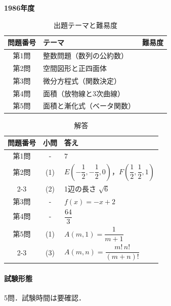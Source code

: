 \documentclass[../../main.tex]{subfiles}
\begin{document}
\begin{center}
  {\fontsize{48pt}{58pt}\selectfont \textbf{1986}\normalsize\textbf{年度}}
\end{center}

\begin{table}[htb]
  \centering
  \caption{出題テーマと難易度}
  \begin{tabular}{|c|p{9cm}|c|}
    \hline
    \textbf{問題番号} & \textbf{テーマ} & \textbf{難易度} \\
    \hline
    第1問 & 整数問題（数列の公約数） & \\
    \hline
    第2問 & 空間図形と正四面体 & \\
    \hline
    第3問 & 微分方程式（関数決定） & \\
    \hline
    第4問 & 面積（放物線と3次曲線） & \\
    \hline
    第5問 & 面積と漸化式（ベータ関数） & \\
    \hline
  \end{tabular}
\end{table}

\begin{table}[htb]
  \centering
  \caption{解答}
  \renewcommand{\arraystretch}{1.4}
  \begin{tabular}{|c|c|p{9cm}|}
    \hline
    \textbf{問題番号} & \textbf{小問} & \textbf{答え} \\
    \hline
    第1問 & - & $7$ \\
    \hline
    第2問 & (1) & $E\left(-\dfrac{1}{2},-\dfrac{1}{2},0\right)$，$F\left(\dfrac{1}{2},\dfrac{1}{2},1\right)$ \\
    \cline{2-3}
    & (2) & 1辺の長さ $\sqrt{6}$ \\
    \hline
    第3問 & - & $f(x)=-x+2$ \\
    \hline
    第4問 & - & $\dfrac{64}{3}$ \\
    \hline
    第5問 & (1) & $A(m,1)=\dfrac{1}{m+1}$ \\
    \cline{2-3}
    & (3) & $A(m,n)=\dfrac{m!\,n!}{(m+n)!}$ \\
    \hline
  \end{tabular}
\end{table}

\paragraph{試験形態}
5問．試験時間は要確認．
\end{document}

